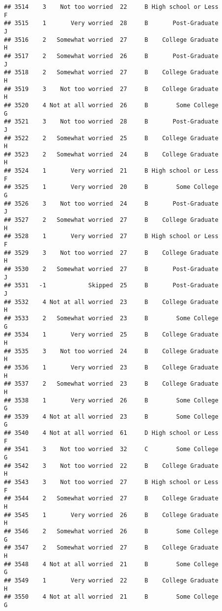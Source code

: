 \documentclass[
]{article}
\begin{document}
\begin{verbatim}
## 3514    3    Not too worried  22     B High school or Less         F
## 3515    1       Very worried  28     B       Post-Graduate         J
## 3516    2   Somewhat worried  27     B    College Graduate         H
## 3517    2   Somewhat worried  26     B       Post-Graduate         J
## 3518    2   Somewhat worried  27     B    College Graduate         H
## 3519    3    Not too worried  27     B    College Graduate         H
## 3520    4 Not at all worried  26     B        Some College         G
## 3521    3    Not too worried  28     B       Post-Graduate         J
## 3522    2   Somewhat worried  25     B    College Graduate         H
## 3523    2   Somewhat worried  24     B    College Graduate         H
## 3524    1       Very worried  21     B High school or Less         F
## 3525    1       Very worried  20     B        Some College         G
## 3526    3    Not too worried  24     B       Post-Graduate         J
## 3527    2   Somewhat worried  27     B    College Graduate         H
## 3528    1       Very worried  27     B High school or Less         F
## 3529    3    Not too worried  27     B    College Graduate         H
## 3530    2   Somewhat worried  27     B       Post-Graduate         J
## 3531   -1            Skipped  25     B       Post-Graduate         J
## 3532    4 Not at all worried  23     B    College Graduate         H
## 3533    2   Somewhat worried  23     B        Some College         G
## 3534    1       Very worried  25     B    College Graduate         H
## 3535    3    Not too worried  24     B    College Graduate         H
## 3536    1       Very worried  23     B    College Graduate         H
## 3537    2   Somewhat worried  23     B    College Graduate         H
## 3538    1       Very worried  26     B        Some College         G
## 3539    4 Not at all worried  23     B        Some College         G
## 3540    4 Not at all worried  61     D High school or Less         F
## 3541    3    Not too worried  32     C        Some College         G
## 3542    3    Not too worried  22     B    College Graduate         H
## 3543    3    Not too worried  27     B High school or Less         F
## 3544    2   Somewhat worried  27     B    College Graduate         H
## 3545    1       Very worried  26     B    College Graduate         H
## 3546    2   Somewhat worried  26     B        Some College         G
## 3547    2   Somewhat worried  27     B    College Graduate         H
## 3548    4 Not at all worried  21     B        Some College         G
## 3549    1       Very worried  22     B    College Graduate         H
## 3550    4 Not at all worried  21     B        Some College         G

\end{verbatim}
\end{document}
